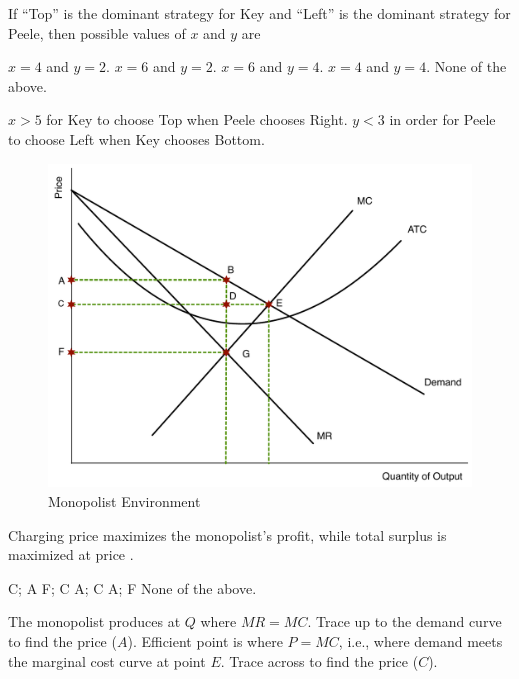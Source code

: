 \documentclass[addpoints,11pt]{exam}
\theoremstyle{definition}
\newcommand{\blank}[0]{\underline{\hspace{3cm}}}
\begin{document}
\begin{questions}
		If ``Top'' is the dominant strategy for Key and ``Left'' is the dominant strategy for Peele, then possible values of $x$ and $y$ are
		
		\begin{choices}
			\choice $x=4$ and $y=2$.
			\CorrectChoice  $x=6$ and $y=2$.
			\choice $x=6$ and $y=4$.
			\choice $x=4$ and $y=4$.
			\choice None of the above.
		\end{choices}
		
		\begin{solution}
			$x>5$ for Key to choose Top when Peele chooses Right. $y<3$ in order for Peele to choose Left when Key chooses Bottom.
		\end{solution}


\begin{figure}[H]
	\centering
	\includegraphics[scale=.4]{Exam2_MC10.pdf}
	\caption{Monopolist Environment}
	\label{MC10}
\end{figure}
	
	\question \label{q4} Charging price \blank maximizes the monopolist's profit, while total surplus is maximized at price \blank.
	
	\begin{choices}
		\choice C; A
		\choice F; C
		\CorrectChoice  A; C
		\choice A; F
		\choice None of the above.
	\end{choices}
	
	\begin{solution}
		The monopolist produces at $Q$ where $MR=MC$. Trace up to the demand curve to find the price ($A$). Efficient point is where $P=MC$, i.e., where demand meets the marginal cost curve at point $E$. Trace across to find the price ($C$).
	\end{solution}
	

\end{questions}
\end{document}
